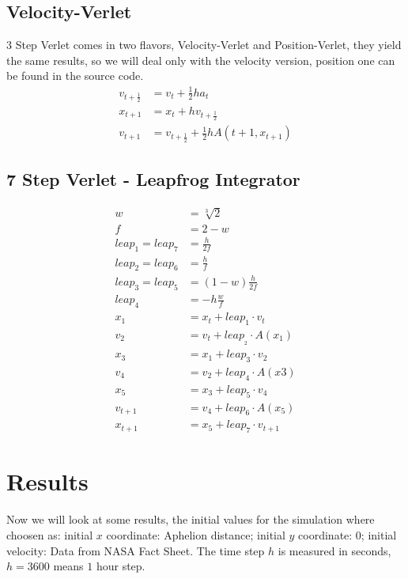 \documentclass[12pt]{article}
\begin{document}
 \subsection{Velocity-Verlet}
 3 Step Verlet comes in two flavors, Velocity-Verlet and Position-Verlet, they yield the same results, so we will deal only with the velocity version, position one can be found in the source code.\\
 \begin{align*}
  v_{t+\frac{1}{2}} &= v_t + \frac{1}{2} h a_t \\
  x_{t+1} &= x_t + h v_{t+\frac{1}{2}}\\
  v_{t+1} &= v_{t+\frac{1}{2}} + \frac{1}{2} h A(t+1, x_{t+1})
 \end{align*}

 \subsection{7 Step Verlet - Leapfrog Integrator}
 \begin{align*}
  w &= \sqrt[3]{2}\\
  f &= 2 - w\\
  leap_1 = leap_7 &= \frac{h}{2f}\\
  leap_2 = leap_6 &= \frac{h}{f}\\
  leap_3 = leap_5 &= (1-w) \frac{h}{2f}\\
  leap_4 &= -h \frac{w}{f}\\
  x_{1} &= x_t + leap_1 \cdot v_t\\
  v_{2} &= v_t + leap__2 \cdot A(x_{1})\\
  x_{3} &= x_{1} + leap_3 \cdot v_{2}\\
  v_{4} &= v_{2} + leap_4 \cdot A(x{3})\\
  x_{5} &= x_{3} + leap_5 \cdot v_{4}\\
  v_{t+1} &= v_{4} + leap_6 \cdot A(x_{5})\\
  x_{t+1} &= x_{5} + leap_7 \cdot v_{t+1}
 \end{align*}

\section{Results}\label{sec:figs}
Now we will look at some results, the initial values for the simulation where choosen as: initial \(x\) coordinate: Aphelion distance; initial \(y\) coordinate: 0; initial velocity: Data from NASA Fact Sheet. The time step \(h\) is measured in seconds, \(h = 3600\) means \(1\) hour step.
\end{document}
